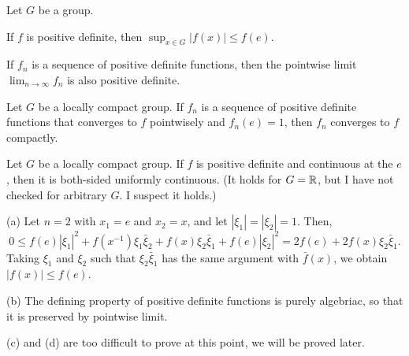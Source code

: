 \documentclass[12pt]{article}
\begin{document}
\begin{prop}
Let $G$ be a group.
\begin{parts}
\item If $f$ is positive definite, then $\sup_{x\in G}|f(x)|\le f(e)$.
\item If $f_n$ is a sequence of positive definite functions, then the pointwise limit $\lim_{n\to\infty}f_n$ is also positive definite.
\item Let $G$ be a locally compact group. If $f_n$ is a sequence of positive definite functions that converges to $f$ pointwisely and $f_n(e)=1$, then $f_n$ converges to $f$ compactly.
\item Let $G$ be a locally compact group. If $f$ is positive definite and continuous at the $e$, then it is both-sided uniformly continuous. (It holds for $G=\mathbb{R}$, but I have not checked for arbitrary $G$. I suspect it holds.)
\end{parts}
\end{prop}
\begin{pf}
(a)
Let $n=2$ with $x_1=e$ and $x_2=x$, and let $|\xi_1|=|\xi_2|=1$.
Then,
\[0\le f(e)|\xi_1|^2+f(x^{-1})\xi_1\bar\xi_2+f(x)\xi_2\bar\xi_1+f(e)|\xi_2|^2=2f(e)+2f(x)\xi_2\bar\xi_1.\]
Taking $\xi_1$ and $\xi_2$ such that $\xi_2\bar\xi_1$ has the same argument with $\bar f(x)$, we obtain $|f(x)|\le f(e)$.

(b)
The defining property of positive definite functions is purely algebriac, so that it is preserved by pointwise limit.

(c) and (d) are too difficult to prove at this point, we will be proved later.
\end{pf}

\begin{ex}

\end{ex}

\bigskip
\end{document}
